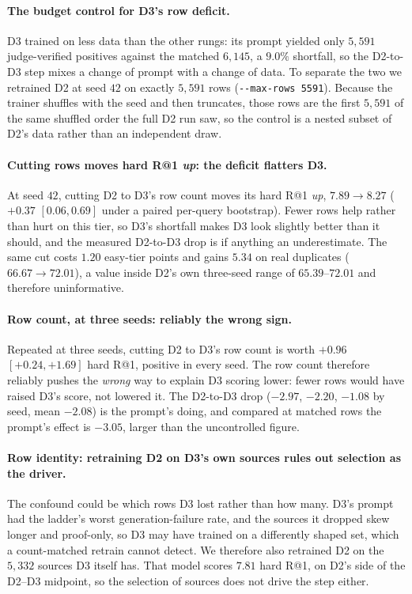 \paragraph{The budget control for D3's row deficit.}
D3 trained on less data than the other rungs: its prompt yielded only $5{,}591$ judge-verified positives against the matched $6{,}145$, a $9.0\%$ shortfall, so the D2-to-D3 step mixes a change of prompt with a change of data. To separate the two we retrained D2 at seed $42$ on exactly $5{,}591$ rows (\verb|--max-rows 5591|). Because the trainer shuffles with the seed and then truncates, those rows are the first $5{,}591$ of the same shuffled order the full D2 run saw, so the control is a nested subset of D2's data rather than an independent draw.

\paragraph{Cutting rows moves hard R@1 \emph{up}: the deficit flatters D3.}
At seed $42$, cutting D2 to D3's row count moves its hard R@1 \emph{up}, $7.89 \to 8.27$ ($+0.37$ $[0.06, 0.69]$ under a paired per-query bootstrap). Fewer rows help rather than hurt on this tier, so D3's shortfall makes D3 look slightly better than it should, and the measured D2-to-D3 drop is if anything an underestimate. The same cut costs $1.20$ easy-tier points and gains $5.34$ on real duplicates ($66.67 \to 72.01$), a value inside D2's own three-seed range of $65.39$--$72.01$ and therefore uninformative.

\paragraph{Row count, at three seeds: reliably the wrong sign.}
Repeated at three seeds, cutting D2 to D3's row count is worth $+0.96$ $[+0.24, +1.69]$ hard R@1, positive in every seed. The row count therefore reliably pushes the \emph{wrong} way to explain D3 scoring lower: fewer rows would have raised D3's score, not lowered it. The D2-to-D3 drop ($-2.97$, $-2.20$, $-1.08$ by seed, mean $-2.08$) is the prompt's doing, and compared at matched rows the prompt's effect is $-3.05$, larger than the uncontrolled figure.

\paragraph{Row identity: retraining D2 on D3's own sources rules out selection as the driver.}
The confound could be which rows D3 lost rather than how many. D3's prompt had the ladder's worst generation-failure rate, and the sources it dropped skew longer and proof-only, so D3 may have trained on a differently shaped set, which a count-matched retrain cannot detect. We therefore also retrained D2 on the $5{,}332$ sources D3 itself has. That model scores $7.81$ hard R@1, on D2's side of the D2--D3 midpoint, so the selection of sources does not drive the step either.

